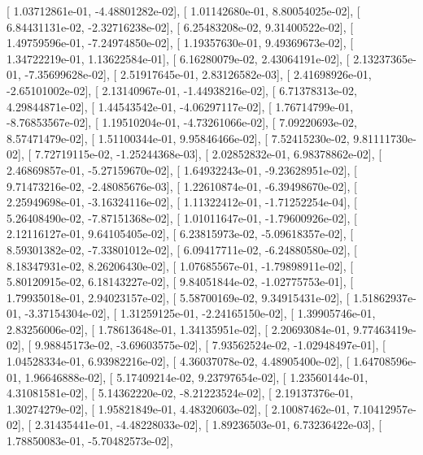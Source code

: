 \documentclass{article}
\begin{document}
       [  1.03712861e-01,  -4.48801282e-02],
       [  1.01142680e-01,   8.80054025e-02],
       [  6.84431131e-02,  -2.32716238e-02],
       [  6.25483208e-02,   9.31400522e-02],
       [  1.49759596e-01,  -7.24974850e-02],
       [  1.19357630e-01,   9.49369673e-02],
       [  1.34722219e-01,   1.13622584e-01],
       [  6.16280079e-02,   2.43064191e-02],
       [  2.13237365e-01,  -7.35699628e-02],
       [  2.51917645e-01,   2.83126582e-03],
       [  2.41698926e-01,  -2.65101002e-02],
       [  2.13140967e-01,  -1.44938216e-02],
       [  6.71378313e-02,   4.29844871e-02],
       [  1.44543542e-01,  -4.06297117e-02],
       [  1.76714799e-01,  -8.76853567e-02],
       [  1.19510204e-01,  -4.73261066e-02],
       [  7.09220693e-02,   8.57471479e-02],
       [  1.51100344e-01,   9.95846466e-02],
       [  7.52415230e-02,   9.81111730e-02],
       [  7.72719115e-02,  -1.25244368e-03],
       [  2.02852832e-01,   6.98378862e-02],
       [  2.46869857e-01,  -5.27159670e-02],
       [  1.64932243e-01,  -9.23628951e-02],
       [  9.71473216e-02,  -2.48085676e-03],
       [  1.22610874e-01,  -6.39498670e-02],
       [  2.25949698e-01,  -3.16324116e-02],
       [  1.11322412e-01,  -1.71252254e-04],
       [  5.26408490e-02,  -7.87151368e-02],
       [  1.01011647e-01,  -1.79600926e-02],
       [  2.12116127e-01,   9.64105405e-02],
       [  6.23815973e-02,  -5.09618357e-02],
       [  8.59301382e-02,  -7.33801012e-02],
       [  6.09417711e-02,  -6.24880580e-02],
       [  8.18347931e-02,   8.26206430e-02],
       [  1.07685567e-01,  -1.79898911e-02],
       [  5.80120915e-02,   6.18143227e-02],
       [  9.84051844e-02,  -1.02775753e-01],
       [  1.79935018e-01,   2.94023157e-02],
       [  5.58700169e-02,   9.34915431e-02],
       [  1.51862937e-01,  -3.37154304e-02],
       [  1.31259125e-01,  -2.24165150e-02],
       [  1.39905746e-01,   2.83256006e-02],
       [  1.78613648e-01,   1.34135951e-02],
       [  2.20693084e-01,   9.77463419e-02],
       [  9.98845173e-02,  -3.69603575e-02],
       [  7.93562524e-02,  -1.02948497e-01],
       [  1.04528334e-01,   6.93982216e-02],
       [  4.36037078e-02,   4.48905400e-02],
       [  1.64708596e-01,   1.96646888e-02],
       [  5.17409214e-02,   9.23797654e-02],
       [  1.23560144e-01,   4.31081581e-02],
       [  5.14362220e-02,  -8.21223524e-02],
       [  2.19137376e-01,   1.30274279e-02],
       [  1.95821849e-01,   4.48320603e-02],
       [  2.10087462e-01,   7.10412957e-02],
       [  2.31435441e-01,  -4.48228033e-02],
       [  1.89236503e-01,   6.73236422e-03],
       [  1.78850083e-01,  -5.70482573e-02],
\end{document}
